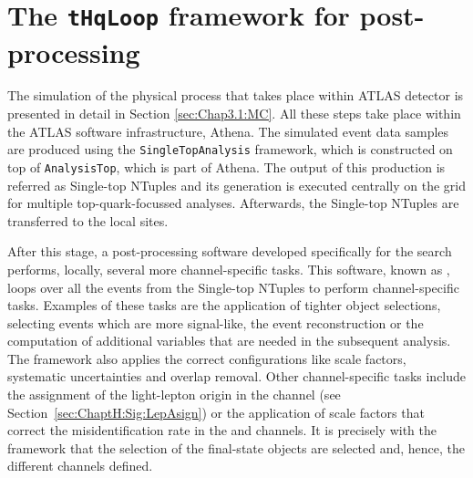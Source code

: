 \chapter{The \texttt{tHqLoop} framework for post-processing}
\label{chap:Appendix:tHqLoop}


The simulation of the physical process that takes place within ATLAS detector is presented in detail
in Section \ref{sec:Chap3.1:MC}. All these steps take place within the ATLAS software infrastructure,
Athena. 
The simulated event data samples are produced using  the \texttt{SingleTopAnalysis} framework, 
which is constructed on top of \texttt{AnalysisTop}, which is part of Athena. 
The output of this production is referred as Single-top NTuples and its generation is executed centrally on 
the grid for multiple top-quark-focussed analyses. Afterwards, the Single-top NTuples are transferred to the local sites.

After this stage, a post-processing software developed specifically for the \tHq search performs, locally,
several more channel-specific tasks. This software, known as \thqloop, loops over all the events
from the Single-top NTuples to perform channel-specific tasks.
Examples of these tasks are the application of tighter object selections, selecting events which are more signal-like,
the event reconstruction or the computation of additional variables that are needed in the subsequent analysis.
The \thqloop framework also applies the correct configurations like scale factors, systematic uncertainties and overlap removal.
Other channel-specific tasks include the assignment of the
light-lepton origin in the \dilepSStau channel (see Section~\ref{sec:ChaptH:Sig:LepAsign}) or the application of
scale factors that correct the \tauhad misidentification rate in the \dileptau and \lepditau channels.
It is precisely with the \thqloop framework that the selection of the final-state objects are selected 
and, hence, the different channels defined. 



